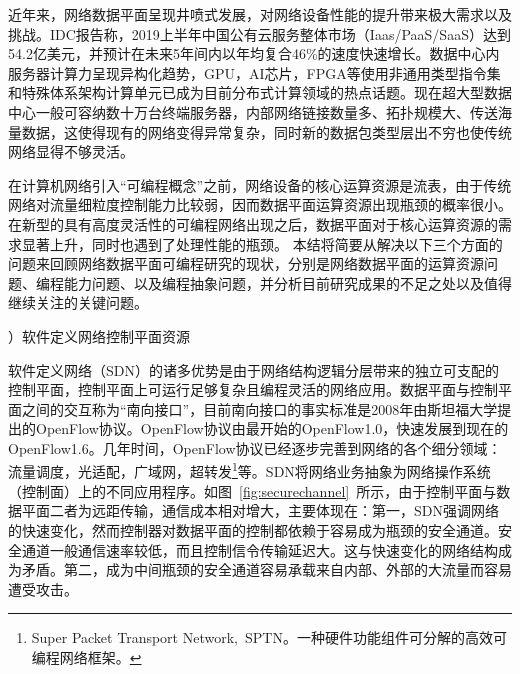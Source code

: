 \label{chap12}

近年来，网络数据平面呈现井喷式发展，对网络设备性能的提升带来极大需求以及挑战。IDC报告称，2019上半年中国公有云服务整体市场（Iaas/PaaS/SaaS）达到54.2亿美元，并预计在未来5年间内以年均复合46\%的速度快速增长。数据中心内服务器计算力呈现异构化趋势，GPU，AI芯片，FPGA等使用非通用类型指令集和特殊体系架构计算单元已成为目前分布式计算领域的热点话题。现在超大型数据中心一般可容纳数十万台终端服务器，内部网络链接数量多、拓扑规模大、传送海量数据，这使得现有的网络变得异常复杂，同时新的数据包类型层出不穷也使传统网络显得不够灵活。

在计算机网络引入“可编程概念”之前，网络设备的核心运算资源是流表，由于传统网络对流量细粒度控制能力比较弱，因而数据平面运算资源出现瓶颈的概率很小。在新型的具有高度灵活性的可编程网络出现之后，数据平面对于核心运算资源的需求显著上升，同时也遇到了处理性能的瓶颈。
本结将简要从解决以下三个方面的问题来回顾网络数据平面可编程研究的现状，分别是网络数据平面的运算资源问题、编程能力问题、以及编程抽象问题，并分析目前研究成果的不足之处以及值得继续关注的关键问题。




\label{chap121}

{）软件定义网络控制平面资源}




软件定义网络（SDN）的诸多优势是由于网络结构逻辑分层带来的独立可支配的控制平面，控制平面上可运行足够复杂且编程灵活的网络应用。数据平面与控制平面之间的交互称为“南向接口”，目前南向接口的事实标准是2008年由斯坦福大学提出的OpenFlow协议。OpenFlow协议由最开始的OpenFlow1.0，快速发展到现在的OpenFlow1.6。几年时间，OpenFlow协议已经逐步完善到网络的各个细分领域：流量调度，光适配，广域网，超转发\footnote{Super Packet Transport Network,~SPTN。一种硬件功能组件可分解的高效可编程网络框架。}等。SDN将网络业务抽象为网络操作系统（控制面）上的不同应用程序。如图~\ref{fig:securechannel}~所示，由于控制平面与数据平面二者为远距传输，通信成本相对增大，主要体现在：第一，SDN强调网络的快速变化，然而控制器对数据平面的控制都依赖于容易成为瓶颈的安全通道。安全通道一般通信速率较低，而且控制信令传输延迟大。这与快速变化的网络结构成为矛盾。第二，成为中间瓶颈的安全通道容易承载来自内部、外部的大流量而容易遭受攻击。

